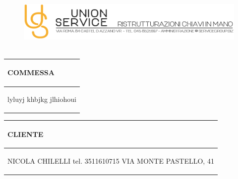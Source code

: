 \documentclass[a4paper]{article}
\begin{document}
                        
                        \begin{figure}[!t]
                        \includegraphics[width=15.8cm, height=3cm]{intestazioneAlta2.jpg}
                        \end{figure}
                        
                        \noindent\begin{tabular}{| L{72.2mm} |}
                            \hline
                            \vspace{2.5mm}
                            \begin{spacing}{0}
                            \textbf{COMMESSA}
                            \end{spacing}\\
                            \hline
                            \vspace{4mm}
                            \begin{spacing}{1.2}

                        lyluyj \newline khbjkg \newline jlhiohoui
                          \end{spacing}\\
                            \hline
                          \end{tabular}
                          \quad
                          \begin{tabular}{ | R{72.2mm} | }
                            \hline
                            \vspace{2.5mm}
                            \begin{spacing}{0}
                            \textbf{CLIENTE}
                            \end{spacing}\\
                            \hline
                            \vspace{4mm}
                            \begin{spacing}{1.2}
                        
                       NICOLA CHILELLI \newline tel. 3511610715 \newline VIA MONTE PASTELLO, 41
                          \end{spacing}\\
                            \hline
                          \end{tabular}
                        
\end{document}
